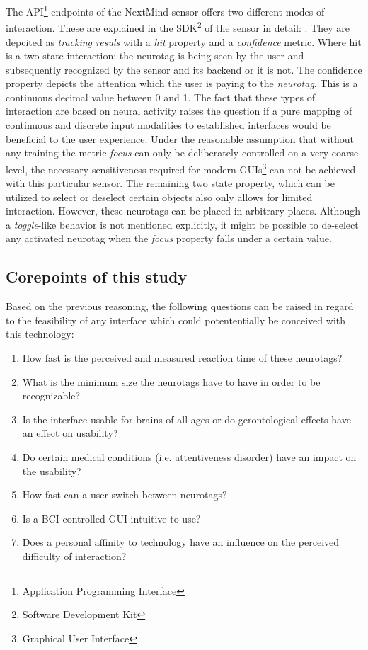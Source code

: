                 The API\footnote{Application Programming Interface} endpoints of the NextMind sensor offers two different modes of interaction. These are explained in the SDK\footnote{Software Development Kit} of the sensor in detail: \cite{NextMind.18112020}.
                They are depcited as \textit{tracking resuls} with a \textit{hit} property and a \textit{confidence} metric. Where hit is a two state interaction: the neurotag is being seen by the user and subsequently recognized by the sensor and its backend or it is not. The confidence property depicts the attention which the user is paying to the \textit{neurotag}. This is a continuous decimal value between 0 and 1.
                The fact that these types of interaction are based on neural activity raises the question if a pure mapping of continuous and discrete input modalities to established interfaces would be beneficial to the user experience. Under the reasonable assumption that without any training the metric \textit{focus} can only be deliberately controlled on a very coarse level, the necessary sensitiveness required for modern GUIs\footnote{Graphical User Interface} can not be achieved with this particular sensor. The remaining two state property, which can be utilized to select or deselect certain objects also only allows for limited interaction. However, these neurotags can be placed in arbitrary places. Although a \textit{toggle}-like behavior is not mentioned explicitly, it might be possible to de-select any activated neurotag when the \textit{focus} property falls under a certain value.

            \subsection{Corepoints of this study}\label{corepoints}

                Based on the previous reasoning, the following questions can be raised in regard to the feasibility of any interface which could potententially be conceived with this technology:

                \begin{enumerate}
                    \item How fast is the perceived and measured reaction time of these neurotags?
                    \item What is the minimum size the neurotags have to have in order to be recognizable?
                    \item Is the interface usable for brains of all ages or do gerontological effects have an effect on usability?
                    \item Do certain medical conditions (i.e. attentiveness disorder) have an impact on the usability?
                    \item How fast can a user switch between neurotags?
                    \item Is a BCI controlled GUI intuitive to use?
                    \item Does a personal affinity to technology have an influence on the perceived difficulty of interaction?
                \end{enumerate}


